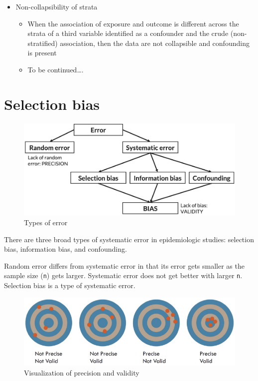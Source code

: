 \documentclass[
]{book}
\providecommand{\tightlist}{%
  \setlength{\itemsep}{0pt}\setlength{\parskip}{0pt}}
\begin{document}
\begin{itemize}
\tightlist
\item
  Non-collapsibility of strata

  \begin{itemize}
  \tightlist
  \item
    When the association of exposure and outcome is different across the strata of a third variable identified as a confounder and the crude (non-stratified) association, then the data are not collapsible and confounding is present
  \item
    To be continued\ldots.
  \end{itemize}
\end{itemize}

\hypertarget{selection-bias}{%
\chapter{Selection bias}\label{selection-bias}}

\begin{figure}

{\centering \includegraphics[width=1\linewidth]{img/selection-bias/types_of_error} 

}

\caption{Types of error}\label{fig:unnamed-chunk-12}
\end{figure}

There are three broad types of systematic error in epidemiologic studies: selection bias, information bias, and confounding.

Random error differs from systematic error in that its error gets smaller as the sample size (\texttt{n}) gets larger. Systematic error does not get better with larger \texttt{n}. Selection bias is a type of systematic error.

\begin{figure}

{\centering \includegraphics[width=1\linewidth]{img/selection-bias/bullseyes} 

}

\caption{Visualization of precision and validity}\label{fig:unnamed-chunk-13}
\end{figure}
\end{document}
